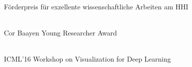 {
    \ifdefined\shortcv
        {}
    \else
        {   \\
            F\"orderpreis f\"ur exzellente wissenschaftliche Arbeiten am HHI
        }
    \fi
}


{
    \ifdefined\shortcv
        {}
    \else
        {   \\
            Cor Baayen Young Researcher Award
        }
    \fi
}


{
    \ifdefined\shortcv
        {}
    \else
        {   \\
            ICML'16 Workshop on Visualization for Deep Learning
        }
    \fi
}


